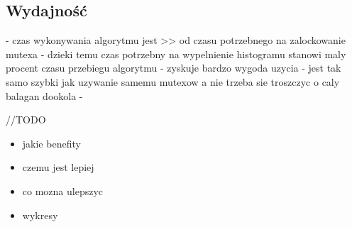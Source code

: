 \subsection{Wydajność}
- czas wykonywania algorytmu jest >> od czasu potrzebnego na zalockowanie mutexa
- dzieki temu czas potrzebny na wypelnienie histogramu stanowi maly procent czasu przebiegu algorytmu
- zyskuje bardzo wygoda uzycia
- jest tak samo szybki jak uzywanie samemu mutexow a nie trzeba sie troszczyc o caly balagan dookola
- 

//TODO
\begin{itemize}
\item jakie benefity
\item czemu jest lepiej
\item co mozna ulepszyc
\item wykresy
\end{itemize}
